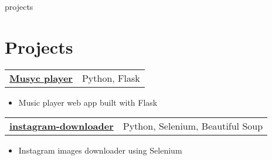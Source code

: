 \documentclass[letterpaper,11pt]{article}
\makeatletter
\newcommand{\heading}[4]{
    \normalsize
    \begin{tabular*}{0.97\textwidth}[t]{l@{\extracolsep{\fill}}r}
      \textbf{#1} & #2 \\[-2pt]
      \textit{\small#3} & \textit{\small #4}
    \end{tabular*}
    \vspace{-2pt}
}
\newcommand{\subheading}[2]{
    \normalsize
    \begin{tabular*}{0.97\textwidth}[t]{l@{\extracolsep{\fill}}r}
      \textbf{#1} & #2 \\
    \end{tabular*}
    \vspace{-2pt}
}
\makeatother
\begin{document}
\begin{filecontents*}[overwrite]{projects}
    \section{Projects}
        
    
        \item \subheading{\href{https://github.com/ngntrgduc/musyc-player}{Musyc player \faGithub}}
        {Python, Flask}
        \begin{itemize}
            \item Music player web app built with Flask 
        \end{itemize}
    
        \item \subheading{\href{https://github.com/ngntrgduc/instagram-downloader}{instagram-downloader \faGithub}}
        {Python, Selenium, Beautiful Soup}
        \begin{itemize}
            \item Instagram images downloader using Selenium
        \end{itemize}


\end{filecontents*}
\end{document}
